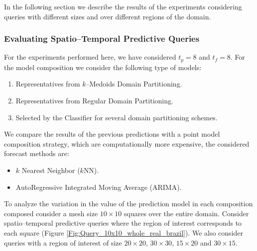 In the following section we describe the results of the experiments considering queries with different sizes and over different regions of the domain.

\subsubsection{Evaluating Spatio--Temporal Predictive Queries}
\label{Sec:ExperimentsQueries}

For the experiments performed here, we have considered $t_{p} = 8$ and $t_{f} = 8$. For the model composition we consider the following type of models:

\begin{enumerate}
	\item Representatives from $k$--Medoids Domain Partitioning.
	\item Representatives from Regular Domain Partitioning.
	\item Selected by the Classifier for several domain partitioning schemes.
\end{enumerate}

We compare the results of the previous predictions with a point model composition strategy, which are computationally more expensive, the considered forecast methods are: 
\begin{itemize}
	\item $k$ Nearest Neighbor ($k$NN).
	\item AutoRegressive Integrated Moving Average (ARIMA).
\end{itemize}

To analyze the variation in the value of the prediction model in each composition composed consider a mesh size $10\times 10$ squares over the entire domain. Consider spatio--temporal predictive queries where the region of interest corresponds to each square (Figure \ref{Fig:Query_10x10_whole_real_brazil}). We also consider queries with a region of interest of size $20\times 20$, $30 \times 30$, $15 \times 20$ and $30 \times 15$. 

